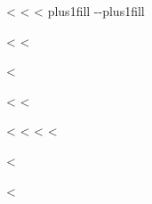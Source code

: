 \documentclass[letterpaper,10pt,english]{sphinxmanual}
\begin{document}
\begin{savenotes}
\begin{savenotes}
\begin{savenotes}


\vspace{-5px}



\begin{savenotes}<%
<%
\sphinxthistablewithglobalstyle
\sphinxthistablewithnovlinesstyle
<%
  \LTleft \@totalleftmargin plus1fill
  \LTright\dimexpr\columnwidth-\@totalleftmargin-\linewidth\relax plus1fill
\makeatother
\begin{longtable}{}<%
\sphinxtoprule
<%
\hline

<%

<%
    \makebox[0pt]<%
{\makebox[0pt]<%
<%
<%
<%

<%

<%
\multicolumn{2}{r}{<%
    <%
<%
\endfoot

\endlastfoot<%
\sphinxtableatstartofbodyhook<%
\begin{varwidth}[t]{\sphinxcolwidth{1}{2}}
<%


\end{varwidth}}}
\end{longtable}
\end{savenotes}
\end{savenotes}
\end{savenotes}
\end{savenotes}
\end{document}
